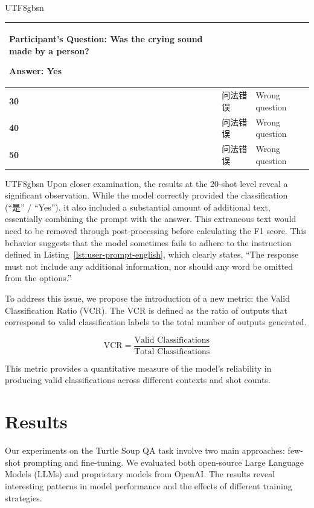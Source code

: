 \documentclass[conference]{IEEEtran}
\begin{document}
\begin{table}[h!]
\begin{CJK*}{UTF8}{gbsn}
{\begin{tabular}{|l|p{6.5cm}|p{10cm}|}
Participant’s Question: Was the crying sound made by a person?

Answer: Yes \\ \hline
\textbf{30} & 问法错误 & Wrong question \\ \hline
\textbf{40} & 问法错误 & Wrong question \\ \hline
\textbf{50} & 问法错误 & Wrong question \\ \hline
\end{tabular}
}
\end{CJK*}
\end{table}


\begin{CJK*}{UTF8}{gbsn}
Upon closer examination, the results at the 20-shot level reveal a significant observation. While the model correctly provided the classification (“是” / “Yes”), it also included a substantial amount of additional text, essentially combining the prompt with the answer. This extraneous text would need to be removed through post-processing before calculating the F1 score. This behavior suggests that the model sometimes fails to adhere to the instruction defined in Listing~\ref{lst:user-prompt-english}, which clearly states, “The response must not include any additional information, nor should any word be omitted from the options.”
\end{CJK*}

To address this issue, we propose the introduction of a new metric: the Valid Classification Ratio (VCR). The VCR is defined as the ratio of outputs that correspond to valid classification labels to the total number of outputs generated.

\begin{equation}
\text{VCR} = \frac{\text{Valid Classifications}}{\text{Total Classifications}}
\end{equation}

This metric provides a quantitative measure of the model's reliability in producing valid classifications across different contexts and shot counts.
\section{Results}
Our experiments on the Turtle Soup QA task involve two main approaches: few-shot prompting and fine-tuning. We evaluated both open-source Large Language Models (LLMs) and proprietary models from OpenAI. The results reveal interesting patterns in model performance and the effects of different training strategies.
\end{document}
